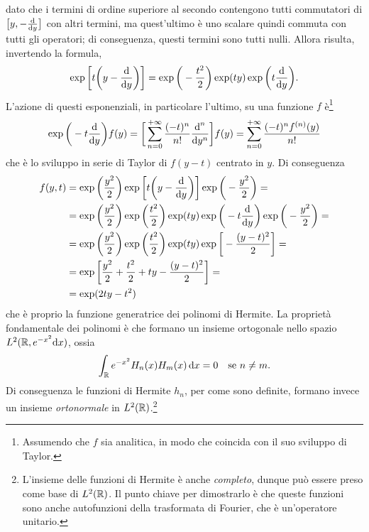 dato che i termini di ordine superiore al secondo contengono tutti commutatori di $\big[y,-\frac{\textup{d} {}}{\textup{d} {y}}\big]$ con altri termini, ma quest'ultimo è uno scalare quindi commuta con tutti gli operatori; di conseguenza, questi termini sono tutti nulli.
Allora risulta, invertendo la formula,
\begin{equation}
	\exp\bigg[t\bigg(y-\frac{\textup{d} {}}{\textup{d} {y}}\bigg)\bigg]=\exp\bigg(-\frac{t^2}2\bigg)\exp(ty)\exp\bigg(t\frac{\textup{d} {}}{\textup{d} {y}}\bigg).
\end{equation}
L'azione di questi esponenziali, in particolare l'ultimo, su una funzione $f$ è\footnote{Assumendo che $f$ sia analitica, in modo che coincida con il suo sviluppo di Taylor.}
\begin{equation}
	\exp\bigg(-t\frac{\textup{d} {}}{\textup{d} {y}}\bigg)f(y)=\bigg[\sum_{n=0}^{+\infty}\frac{(-t)^n}{n!}\frac{\textup{d}^n}{\textup{d} y^n}\bigg]f(y)=\sum_{n=0}^{+\infty}\frac{(-t)^nf^{(n)}(y)}{n!}
\end{equation}
che è lo sviluppo in serie di Taylor di $f(y-t)$ centrato in $y$.
Di conseguenza
\begin{equation}
	\begin{split}
		f(y,t)&=\exp\bigg(\frac{y^2}2\bigg)\exp\bigg[t\bigg(y-\frac{\textup{d} {}}{\textup{d} {y}}\bigg)\bigg]\exp\bigg(-\frac{y^2}2\bigg)=\\
		&=\exp\bigg(\frac{y^2}2\bigg)\exp\bigg(\frac{t^2}2\bigg)\exp(ty)\exp\bigg(-t\frac{\textup{d} {}}{\textup{d} {y}}\bigg)\exp\bigg(-\frac{y^2}2\bigg)=\\
		&=\exp\bigg(\frac{y^2}2\bigg)\exp\bigg(\frac{t^2}2\bigg)\exp(ty)\exp\bigg[-\frac{(y-t)^2}2\bigg]=\\
		&=\exp\bigg[\frac{y^2}2+\frac{t^2}2+ty-\frac{(y-t)^2}2\bigg]=\\
		&=\exp(2ty-t^2)
	\end{split}
\end{equation}
che è proprio la funzione generatrice dei polinomi di Hermite.
La proprietà fondamentale dei polinomi è che formano un insieme ortogonale nello spazio $L^2(\mathbb{R},e^{-x^2}\textup{d} x)$, ossia
\begin{equation}
	\int_{\mathbb{R}}e^{-x^2}H_n(x)H_m(x)\,\textup{d} x=0\quad\text{se }n\ne m.
	\label{eq:ortogonalita-polinomi-hermite}
\end{equation}
Di conseguenza le funzioni di Hermite $h_n$, per come sono definite, formano invece un insieme \emph{ortonormale} in $L^2(\mathbb{R})$.\footnote{L'insieme delle funzioni di Hermite è anche \emph{completo}, dunque può essere preso come base di $L^2(\mathbb{R})$. Il punto chiave per dimostrarlo è che queste funzioni sono anche autofunzioni della trasformata di Fourier, che è un'operatore unitario.}

